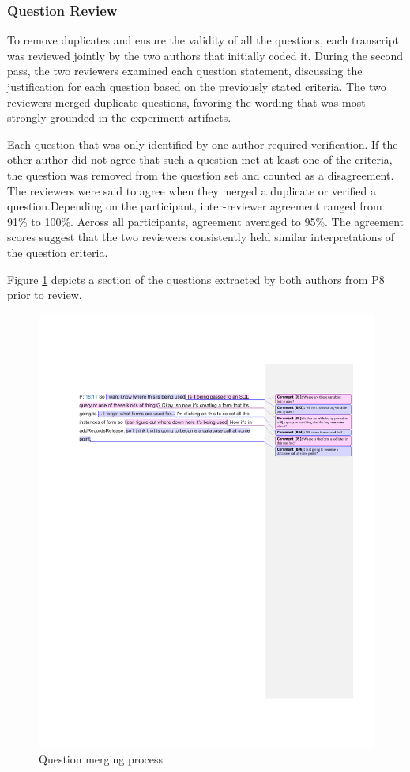\documentclass[conference]{IEEEtran}
\begin{document}
\subsubsection{Question Review}
To remove duplicates and ensure the validity of all the questions, each transcript was reviewed jointly by the two authors that initially coded it.
During the second pass, the two reviewers examined each question statement, discussing the justification for each question based on the previously stated criteria.
The two reviewers merged duplicate questions, favoring the wording that was most strongly grounded in the experiment artifacts.

Each question that was only identified by one author required verification.
If the other author did not agree that such a question met at least one of the criteria, the question was removed from the question set and counted as a disagreement.
The reviewers were said to agree when they merged a duplicate or verified a question.Depending on the participant, inter-reviewer agreement ranged from 91\% to 100\%. Across all participants, agreement averaged to 95\%.
The agreement scores suggest that the two reviewers consistently held similar interpretations of the question criteria.


Figure \ref{fig:merging} depicts a section of the questions extracted by both authors from P8 prior to review.

\begin{figure}
\centering
\includegraphics[width=7.5in]{Images/QuestionMerging}
\caption{Question merging process}
\label{fig:merging} 
\end{figure}
\end{document}
